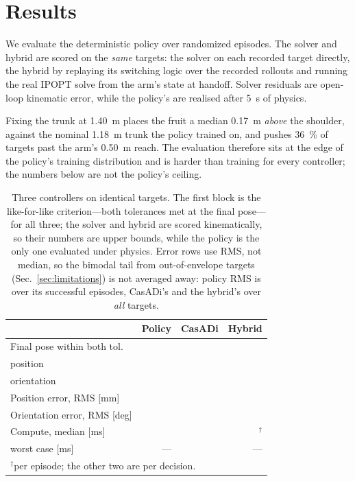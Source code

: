 \documentclass[conference]{IEEEtran}
\begin{document}
\section{Results}
\label{sec:results}

We evaluate the deterministic policy over \RESnepisodes{} randomized episodes.
The solver and hybrid are scored on the \emph{same} targets: the solver on
each recorded target directly, the hybrid by replaying its switching logic
over the recorded rollouts and running the real IPOPT solve from the arm's
state at handoff. Solver residuals are open-loop kinematic error, while the
policy's are realised after \SI{5}{\second} of physics.

Fixing the trunk at \SI{1.40}{\metre} places the fruit a median
\SI{0.17}{\metre} \emph{above} the shoulder, against the nominal
\SI{1.18}{\metre} trunk the policy trained on, and pushes \SI{36}{\percent} of
targets past the arm's \SI{0.50}{\metre} reach. The evaluation therefore sits
at the edge of the policy's training distribution and is harder than training
for every controller; the numbers below are not the policy's ceiling.

\begin{table}[t]
\centering
\caption{Three controllers on identical targets. The first block is the
like-for-like criterion---both tolerances met at the final pose---for all
three; the solver and hybrid are scored kinematically, so their numbers are
upper bounds, while the policy is the only one evaluated under physics. Error
rows use RMS, not median, so the bimodal tail from out-of-envelope targets
(Sec.~\ref{sec:limitations}) is not averaged away: policy RMS is over its
successful episodes, CasADi's and the hybrid's over \emph{all} targets.}
\label{tab:compare}
\small
\begin{tabular}{lrrr}
\toprule
& Policy & CasADi & Hybrid \\
\midrule
Final pose within both tol. & \RESfinalpose{} & \CASfeasible{} & \HYBsuccess{} \\
\quad position & \RESposonly{} & \CASposfeasible{} & \HYBpos{} \\
\quad orientation & \RESorionly{} & \CASorifeasible{} & \HYBori{} \\
\midrule
Position error, RMS [mm] & \RESdfinal{} & \CASposRMS{} & \HYBdfinal{} \\
Orientation error, RMS [deg] & \RESthetafinal{} & \CASoriRMS{} & \HYBtheta{} \\
\midrule
Compute, median [ms] & \RLforward{} & \CASsolveMed{} & \HYBcompute{}$^\dagger$ \\
\quad worst case [ms] & --- & \CASsolveMax{} & --- \\
\bottomrule
\multicolumn{4}{l}{\footnotesize $^\dagger$per episode; the other two are per decision.}
\end{tabular}
\end{table}
\end{document}
